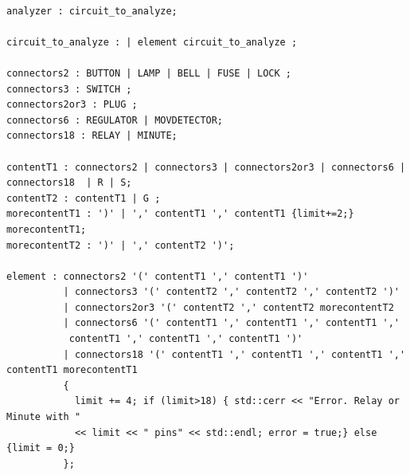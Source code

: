 \documentclass{article}
\begin{document}
\begin{lstlisting}[basicstyle=\footnotesize]

analyzer : circuit_to_analyze;

circuit_to_analyze : | element circuit_to_analyze ;

connectors2 : BUTTON | LAMP | BELL | FUSE | LOCK ;
connectors3 : SWITCH ;
connectors2or3 : PLUG ;
connectors6 : REGULATOR | MOVDETECTOR;
connectors18 : RELAY | MINUTE;

contentT1 : connectors2 | connectors3 | connectors2or3 | connectors6 | connectors18  | R | S;
contentT2 : contentT1 | G ;
morecontentT1 : ')' | ',' contentT1 ',' contentT1 {limit+=2;} morecontentT1;
morecontentT2 : ')' | ',' contentT2 ')';

element : connectors2 '(' contentT1 ',' contentT1 ')'
          | connectors3 '(' contentT2 ',' contentT2 ',' contentT2 ')'
          | connectors2or3 '(' contentT2 ',' contentT2 morecontentT2
          | connectors6 '(' contentT1 ',' contentT1 ',' contentT1 ','
           contentT1 ',' contentT1 ',' contentT1 ')'
          | connectors18 '(' contentT1 ',' contentT1 ',' contentT1 ',' contentT1 morecontentT1
          {
            limit += 4; if (limit>18) { std::cerr << "Error. Relay or Minute with "
            << limit << " pins" << std::endl; error = true;} else {limit = 0;}
          };
\end{lstlisting}
\end{document}
